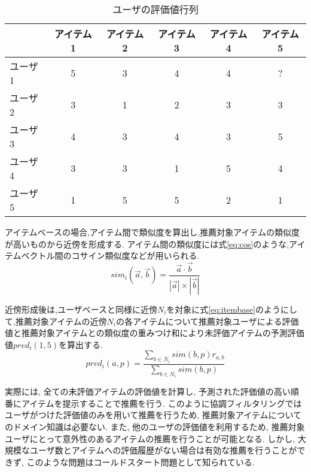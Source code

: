 \begin{table}[ht]
 \caption{ユーザの評価値行列}
 \label{tab:user-table}
 \begin{center}
  \begin{tabular}{|lccccc|} \hline
    & アイテム1 & アイテム2 & アイテム3 & アイテム4 & アイテム5\\ \hline
    ユーザ1	& 5 & 3 & 4 & 4 & ?\\
    ユーザ2	& 3 & 1 & 2 & 3 & 3 \\
    ユーザ3	& 4 & 3 & 4 & 3 & 5\\
    ユーザ4 & 3 & 3 & 1 & 5 & 4\\
    ユーザ5 & 1 & 5 & 5 & 2 & 1\\ \hline
  \end{tabular}
 \end{center}
\end{table}
アイテムベースの場合,アイテム間で類似度を算出し,推薦対象アイテムの類似度が高いものから近傍を形成する.
アイテム間の類似度には式\eqref{eq:cos}のような,アイテムベクトル間のコサイン類似度などが用いられる.
\begin{equation}
    \label{eq:cos}
    sim_i( \vec{a}, \vec{b}) = \frac{  \vec{a} \cdot \vec{b}}{|\vec{a}| \times |\vec{b}|}
\end{equation}

\begin{comment}
ユーザ$u$の未評価のアイテム$p$に対する評価値は, 以下のアイテム$p$とユーザが評価済みのアイテム$i$との類似度の重み付け和の式$pred_i(u, p)$で予測できる.
$r_{u,i}$はユーザ$u$のアイテム$i$についての評価値である.
\begin{equation}
    \label{eq:itembase}
    pred_i(u, p) = \frac{\sum_{i\in {N_i}}{sim_i(p, i)r_{u,i}}}{\sum_{i\in N_i}{sim_i(p, i)}}
\end{equation}
\end{comment}
近傍形成後は,ユーザベースと同様に近傍$N_{i}$を対象に式\eqref{eq:itembase}のようにして,推薦対象アイテムの近傍$N_{i}$の各アイテムについて推薦対象ユーザによる評価値と推薦対象アイテムとの類似度の重みつけ和により未評価アイテムの予測評価値$pred_i(1,5)$を算出する.
\begin{equation}
    \label{eq:itembase}
    pred_i(a, p) = \frac{\sum_{b\in N_i}{sim(b,p)r_{a,b}}}{\sum_{b \in N_i}{sim(b,p)}}
\end{equation}\par
実際には, 全ての未評価アイテムの評価値を計算し, 予測された評価値の高い順番にアイテムを提示することで推薦を行う.
このように協調フィルタリングではユーザがつけた評価値のみを用いて推薦を行うため, 推薦対象アイテムについてのドメイン知識は必要ない.
また, 他のユーザの評価値を利用するため, 推薦対象ユーザにとって意外性のあるアイテムの推薦を行うことが可能となる.
しかし, 大規模なユーザ数とアイテムへの評価履歴がない場合は有効な推薦を行うことができず, このような問題はコールドスタート問題として知られている.

